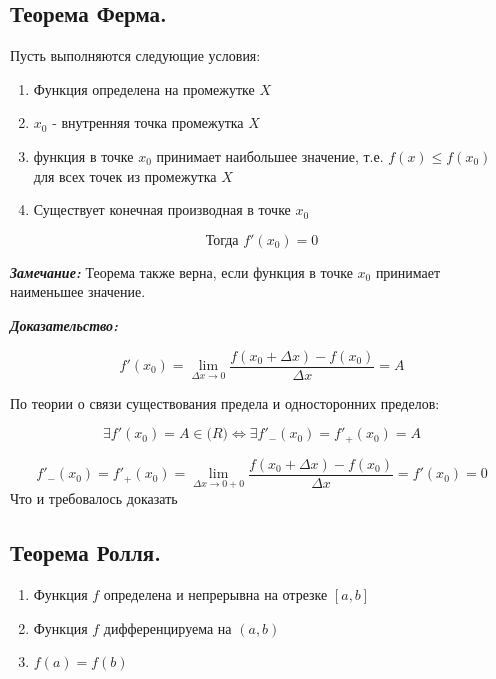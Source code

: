 \documentclass[a4paper,12pt]{article}
\theoremstyle{plain} %
\theoremstyle{definition} %
\theoremstyle{remark} %
\begin{document}
\newpage
\subsection*{Теорема Ферма.                                                                             }

Пусть выполняются следующие условия:

\begin{enumerate}
	\item Функция определена на промежутке $X$
	\item $x_0$ - внутренняя точка промежутка $X$
	\item функция в точке $x_0$ принимает наибольшее значение, т.е. $f(x) \leq f(x_0)$ для всех точек из промежутка $X$
	\item Существует конечная производная в точке $x_0$
\end{enumerate}
\[ \textbf{Тогда } f'(x_0) = 0 \]

\textit{\textbf{Замечание:}} Теорема также верна, если функция в точке $x_0$ принимает наименьшее значение.

\textit{\textbf{Доказательство:}}

\[
	f'(x_0) = \lim_{\Delta x \rightarrow 0} \frac{f(x_0 + \Delta x) - f(x_0)}{\Delta x} = A
\]

По теории о связи существования предела и односторонних пределов:

\[
	\exists f'(x_0) = A \in \mathbf(R) \Leftrightarrow \exists f'_-(x_0) = f'_+(x_0) = A
\]

\[
	f'_-(x_0) = f'_+(x_0) = \lim_{\Delta x \rightarrow 0 + 0} \frac{f(x_0 + \Delta x) - f(x_0)}{\Delta x} = f'(x_0) = 0
\]
Что и требовалось доказать


\newpage
\subsection*{Теорема Ролля.                                                                             }

\begin{enumerate}
	\item Функция $f$ определена и непрерывна на отрезке $[a, b]$
	\item Функция $f$ дифференцируема на $(a, b)$
	\item $f(a) = f(b)$
\end{enumerate}
\end{document}
